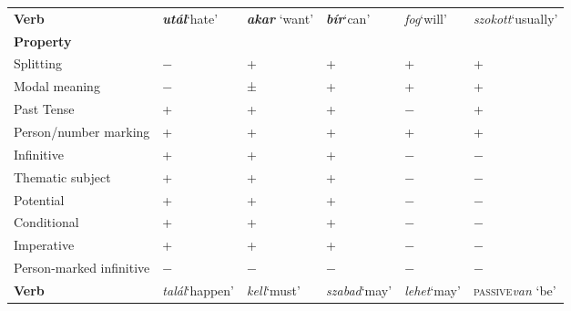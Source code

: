 \documentclass[output=paper]{langsci/langscibook}
\begin{document}
\begin{table}[htpb]
{\smaller
\begin{tabularx}{\textwidth}{lXXXXX}
\lsptoprule
\textbf{Verb}                    & \textbf{\emph{utál}}\newline ‘hate’ & \textbf{\emph{akar}} ‘want’ & \textbf{\emph{bír}}\newline ‘can’ & \emph{fog}\newline ‘will’ & \emph{szokott}\newline ‘usually’ \\
\textbf{Property}                &                             & &                           &                   & \\
\midrule
Splitting                        & −                           & + & +                         & + & +                                \\
Modal meaning                    & −                           & ± & +                         & + & +                                \\
Past Tense                       & +                           & + & +                         & − & +                                \\
Person/number marking    & +                           & + & +                         & + & +                                \\
Infinitive                       & +                           & + & +                         & − & −                                \\
Thematic subject                 & +                           & + & +                         & − & −                                \\
Potential                        & +                           & + & +                         & − & −                                \\
Conditional                      & +                           & + & +                         & − & −                                \\
Imperative                       & +                           & + & +                         & − & −                                \\
Person-marked infinitive & −                           & − & −                         & − & −                                \\
\midrule
\textbf{Verb}                    & \emph{talál}\newline ‘happen’ & \emph{kell}\newline ‘must’ & \emph{szabad}\newline ‘may’ & \emph{lehet}\newline ‘may’ & \textsc{passive}\newline \emph{van} ‘be’   \\

\end{tabularx}}
\end{table}
\end{document}
